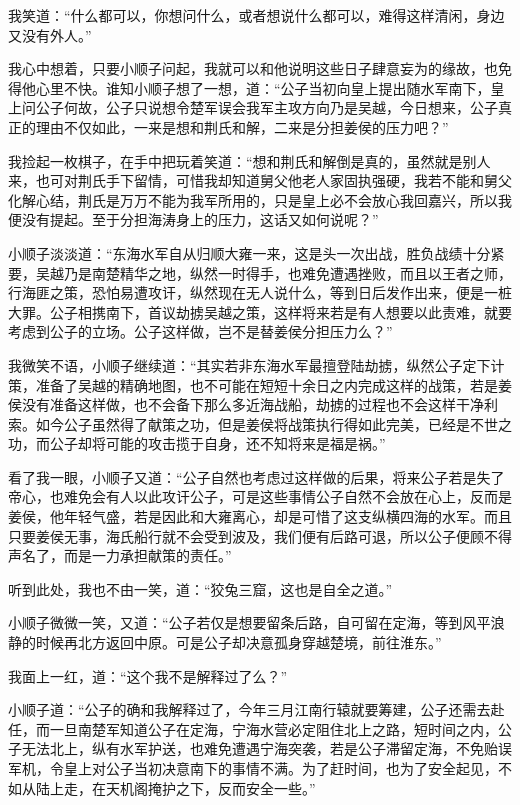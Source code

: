 我笑道：“什么都可以，你想问什么，或者想说什么都可以，难得这样清闲，身边又没有外人。”

我心中想着，只要小顺子问起，我就可以和他说明这些日子肆意妄为的缘故，也免得他心里不快。谁知小顺子想了一想，道：“公子当初向皇上提出随水军南下，皇上问公子何故，公子只说想令楚军误会我军主攻方向乃是吴越，今日想来，公子真正的理由不仅如此，一来是想和荆氏和解，二来是分担姜侯的压力吧？”

我捡起一枚棋子，在手中把玩着笑道：“想和荆氏和解倒是真的，虽然就是别人来，也可对荆氏手下留情，可惜我却知道舅父他老人家固执强硬，我若不能和舅父化解心结，荆氏是万万不能为我军所用的，只是皇上必不会放心我回嘉兴，所以我便没有提起。至于分担海涛身上的压力，这话又如何说呢？”

小顺子淡淡道：“东海水军自从归顺大雍一来，这是头一次出战，胜负战绩十分紧要，吴越乃是南楚精华之地，纵然一时得手，也难免遭遇挫败，而且以王者之师，行海匪之策，恐怕易遭攻讦，纵然现在无人说什么，等到日后发作出来，便是一桩大罪。公子相携南下，首议劫掳吴越之策，这样将来若是有人想要以此责难，就要考虑到公子的立场。公子这样做，岂不是替姜侯分担压力么？”

我微笑不语，小顺子继续道：“其实若非东海水军最擅登陆劫掳，纵然公子定下计策，准备了吴越的精确地图，也不可能在短短十余日之内完成这样的战策，若是姜侯没有准备这样做，也不会备下那么多近海战船，劫掳的过程也不会这样干净利索。如今公子虽然得了献策之功，但是姜侯将战策执行得如此完美，已经是不世之功，而公子却将可能的攻击揽于自身，还不知将来是福是祸。”

看了我一眼，小顺子又道：“公子自然也考虑过这样做的后果，将来公子若是失了帝心，也难免会有人以此攻讦公子，可是这些事情公子自然不会放在心上，反而是姜侯，他年轻气盛，若是因此和大雍离心，却是可惜了这支纵横四海的水军。而且只要姜侯无事，海氏船行就不会受到波及，我们便有后路可退，所以公子便顾不得声名了，而是一力承担献策的责任。”

听到此处，我也不由一笑，道：“狡兔三窟，这也是自全之道。”

小顺子微微一笑，又道：“公子若仅是想要留条后路，自可留在定海，等到风平浪静的时候再北方返回中原。可是公子却决意孤身穿越楚境，前往淮东。”

我面上一红，道：“这个我不是解释过了么？”

小顺子道：“公子的确和我解释过了，今年三月江南行辕就要筹建，公子还需去赴任，而一旦南楚军知道公子在定海，宁海水营必定阻住北上之路，短时间之内，公子无法北上，纵有水军护送，也难免遭遇宁海突袭，若是公子滞留定海，不免贻误军机，令皇上对公子当初决意南下的事情不满。为了赶时间，也为了安全起见，不如从陆上走，在天机阁掩护之下，反而安全一些。”

